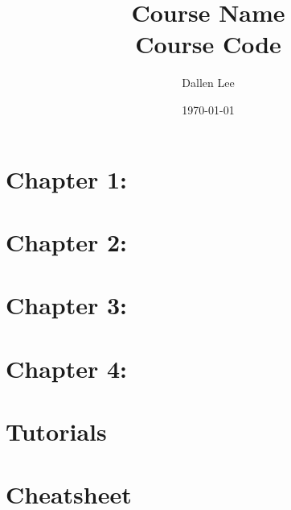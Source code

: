 \documentclass[12pt, a4paper]{article}
\title{\textbf{Course Name}\\[0.5em]\large Course Code} %
\author{Dallen Lee}
\date{\today}
\theoremstyle{plain}
\theoremstyle{definition}
\theoremstyle{remark}
\begin{document}

\maketitle
\thispagestyle{empty}
\tableofcontents
\newpage


\section{Chapter 1:}


\pagebreak

\section{Chapter 2:}


\pagebreak

\section{Chapter 3:}


\pagebreak

\section{Chapter 4:}


\pagebreak


\section{Tutorials}


\pagebreak



\section{Cheatsheet}
\end{document}
